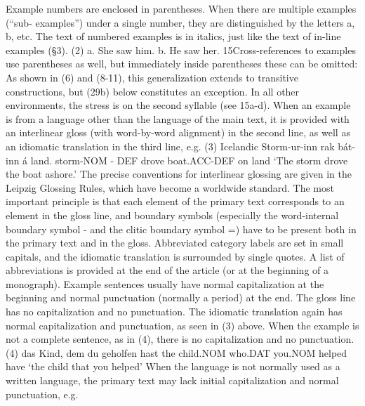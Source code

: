 Example numbers are enclosed in parentheses. When there are multiple examples (“sub-
examples”) under a single number, they are distinguished by the letters a, b, etc. The text
of numbered examples is in italics, just like the text of in-line examples (§3).
(2)
 a. She saw him.
b. He saw her.
15Cross-references to examples use parentheses as well, but immediately inside
parentheses these can be omitted:
As shown in (6) and (8-11), this generalization extends to transitive constructions, but (29b) below
constitutes an exception.
In all other environments, the stress is on the second syllable (see 15a-d).
When an example is from a language other than the language of the main text, it is
provided with an interlinear gloss (with word-by-word alignment) in the second line, as
well as an idiomatic translation in the third line, e.g.
(3) Icelandic
Storm-ur-inn
 rak
 bát-inn
 á land.
storm-NOM - DEF drove boat.ACC-DEF on land
‘The storm drove the boat ashore.’
The precise conventions for interlinear glossing are given in the Leipzig Glossing Rules,
which have become a worldwide standard. The most important principle is that each
element of the primary text corresponds to an element in the gloss line, and boundary
symbols (especially the word-internal boundary symbol - and the clitic boundary symbol =)
have to be present both in the primary text and in the gloss. Abbreviated category labels are
set in small capitals, and the idiomatic translation is surrounded by single quotes. A list of
abbreviations is provided at the end of the article (or at the beginning of a monograph).
Example sentences usually have normal capitalization at the beginning and normal
punctuation (normally a period) at the end. The gloss line has no capitalization and no
punctuation. The idiomatic translation again has normal capitalization and punctuation, as
seen in (3) above. When the example is not a complete sentence, as in (4), there is no
capitalization and no punctuation.
(4) das Kind,
 dem
 du
 geholfen hast
the child.NOM who.DAT you.NOM helped have
‘the child that you helped’
When the language is not normally used as a written language, the primary text may lack
initial capitalization and normal punctuation, e.g.
	
 	
 	
 	
 	
 	
 	
 	
 	
 	
 	
 	
 	
 	
 	
 	
 	
